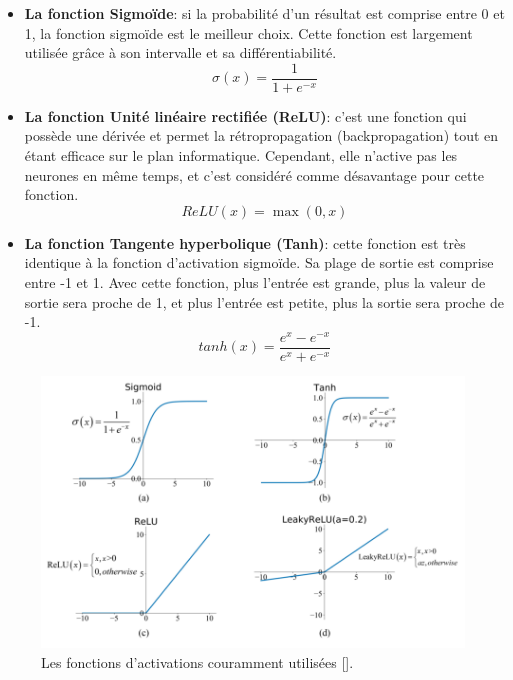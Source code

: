 \begin{itemize}
	\item \textbf{La fonction Sigmoïde}: si la probabilité d’un résultat est comprise entre 0 et 1, la fonction sigmoïde est le meilleur choix. Cette fonction est largement utilisée grâce à son intervalle et sa différentiabilité.
	      \begin{equation}
		      \sigma(x) = \frac{1}{1 + e^{-x}}
	      \end{equation}
	\item \textbf{La fonction Unité linéaire rectifiée (ReLU)}: c'est une fonction qui possède une dérivée et permet la rétropropagation (backpropagation) tout en étant efficace sur le plan informatique. Cependant, elle n’active pas les neurones en même temps, et c’est considéré comme désavantage pour cette fonction.
	      \begin{equation}
		      ReLU(x) = \max(0,x)
	      \end{equation}
	\item \textbf{La fonction Tangente hyperbolique (Tanh)}: cette fonction est très identique à la fonction d’activation sigmoïde. Sa plage de sortie est comprise entre -1 et 1. Avec cette fonction, plus l’entrée est grande, plus la valeur de sortie sera proche de 1, et plus l’entrée est petite, plus la sortie sera proche de -1.
	      \begin{equation}
		      tanh(x) = \frac{e^x - e^{-x}}{e^x + e^{-x}}
	      \end{equation}
\end{itemize}
\medskip
\begin{figure}[hbt!]
	\centering
	\includegraphics[width=12cm]{images_pfe/functions.png}
	\caption{Les fonctions d'activations couramment utilisées [\cite{feng_he_teng_ren_chen_li_2019}].}
	\label{fig:vue-snoc-pos}
\end{figure}
\FloatBarrier

